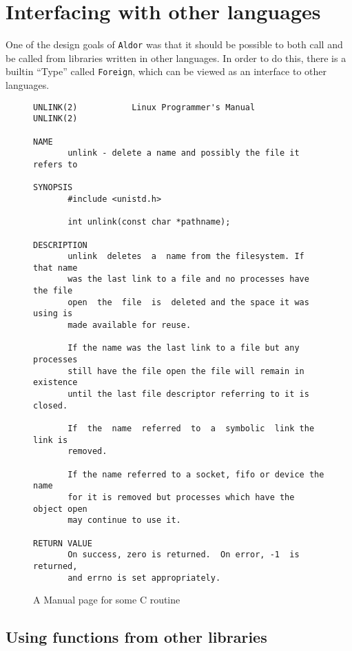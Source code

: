 \documentclass{article}
\newcommand{\Aldor}{{\tt Aldor}}
\begin{document}
\section{Interfacing with other languages}

One of the design goals of \Aldor{} was that it should be possible to
both call and be called from libraries written in other languages.  In
order to do this, there is a builtin ``Type'' called {\tt Foreign},
which can be viewed as an interface to other languages.

\begin{figure}
\label{ManualFigure}
\begin{small}
\begin{center}
\begin{verbatim}
UNLINK(2)           Linux Programmer's Manual           UNLINK(2)

NAME
       unlink - delete a name and possibly the file it refers to

SYNOPSIS
       #include <unistd.h>

       int unlink(const char *pathname);

DESCRIPTION
       unlink  deletes  a  name from the filesystem. If that name
       was the last link to a file and no processes have the file
       open  the  file  is  deleted and the space it was using is
       made available for reuse.

       If the name was the last link to a file but any  processes
       still have the file open the file will remain in existence
       until the last file descriptor referring to it is  closed.

       If  the  name  referred  to  a  symbolic  link the link is
       removed.

       If the name referred to a socket, fifo or device the  name
       for it is removed but processes which have the object open
       may continue to use it.

RETURN VALUE
       On success, zero is returned.  On error, -1  is  returned,
       and errno is set appropriately.
\end{verbatim}
\end{center}
\end{small}
\caption{A Manual page for some C routine}
\end{figure}

\subsection{Using functions from other libraries}
\end{document}
